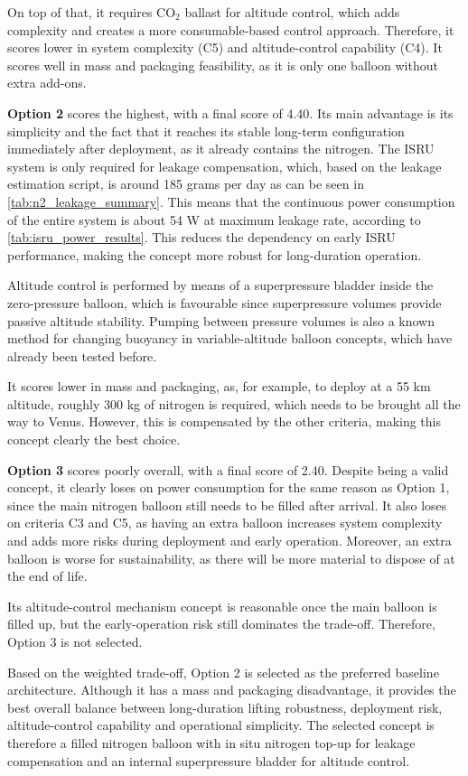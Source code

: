 On top of that, it requires CO$_2$ ballast for altitude control, which adds complexity and creates a more consumable-based control approach. Therefore, it scores lower in system complexity (C5) and altitude-control capability (C4). It scores well in mass and packaging feasibility, as it is only one balloon without extra add-ons.

\textbf{Option 2} scores the highest, with a final score of 4.40. Its main advantage is its simplicity and the fact that it reaches its stable long-term configuration immediately after deployment, as it already contains the nitrogen. The ISRU system is only required for leakage compensation, which, based on the leakage estimation script, is around 185 grams per day as can be seen in \autoref{tab:n2_leakage_summary}. This means that the continuous power consumption of the entire system is about 54 W at maximum leakage rate, according to \autoref{tab:isru_power_results}. This reduces the dependency on early ISRU performance, making the concept more robust for long-duration operation.

Altitude control is performed by means of a superpressure bladder inside the zero-pressure balloon, which is favourable since superpressure volumes provide passive altitude stability. Pumping between pressure volumes is also a known method for changing buoyancy in variable-altitude balloon concepts, which have already been tested before.

It scores lower in mass and packaging, as, for example, to deploy at a 55 km altitude, roughly 300 kg of nitrogen is required, which needs to be brought all the way to Venus. However, this is compensated by the other criteria, making this concept clearly the best choice.

\textbf{Option 3} scores poorly overall, with a final score of 2.40. Despite being a valid concept, it clearly loses on power consumption for the same reason as Option 1, since the main nitrogen balloon still needs to be filled after arrival. It also loses on criteria C3 and C5, as having an extra balloon increases system complexity and adds more risks during deployment and early operation. Moreover, an extra balloon is worse for sustainability, as there will be more material to dispose of at the end of life.

Its altitude-control mechanism concept is reasonable once the main balloon is filled up, but the early-operation risk still dominates the trade-off. Therefore, Option 3 is not selected.

Based on the weighted trade-off, Option 2 is selected as the preferred baseline architecture. Although it has a mass and packaging disadvantage, it provides the best overall balance between long-duration lifting robustness, deployment risk, altitude-control capability and operational simplicity. The selected concept is therefore a filled nitrogen balloon with in situ nitrogen top-up for leakage compensation and an internal superpressure bladder for altitude control.



